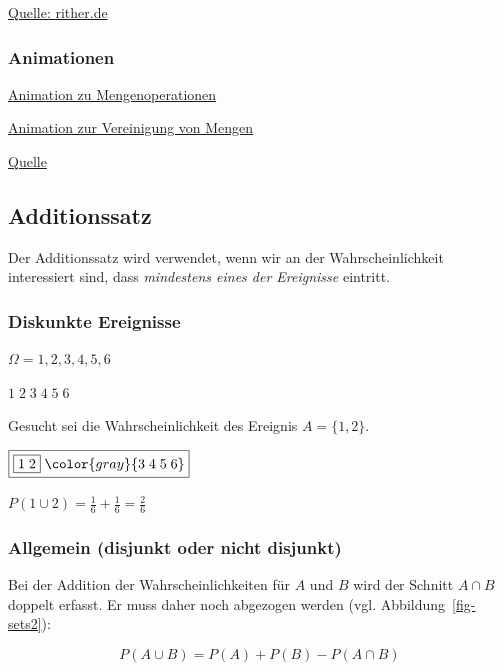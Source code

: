 \documentclass[
  a4paper,
  DIV=11]{scrreprt}
\theoremstyle{definition}
\theoremstyle{remark}
\begin{document}
\href{http://www.rither.de/a/mathematik/stochastik/mengentheorie-und-venn-diagramme/}{Quelle:
rither.de}

\hypertarget{animationen}{%
\subsubsection{Animationen}\label{animationen}}

\href{https://seeing-theory.brown.edu/compound-probability/index.html}{Animation
zu Mengenoperationen}

\href{https://www.geogebra.org/m/GEZV4xXc\#material/cmXR8fHN}{Animation
zur Vereinigung von Mengen}

\href{Geogebra,\%20J.\%20Merschhemke}{Quelle}

\hypertarget{additionssatz}{%
\subsection{Additionssatz}\label{additionssatz}}

Der Additionssatz wird verwendet, wenn wir an der Wahrscheinlichkeit
interessiert sind, dass \emph{mindestens eines der Ereignisse} eintritt.

\hypertarget{diskunkte-ereignisse}{%
\subsubsection{Diskunkte Ereignisse}\label{diskunkte-ereignisse}}

\(\Omega = {1,2,3,4,5,6}\)

\(\boxed{1\; 2\; 3\; 4\; 5\; 6}\)

Gesucht sei die Wahrscheinlichkeit des Ereignis \(A=\{1,2\}\).

\(\boxed{\boxed{1\; 2}\; \color{gray}{ 3\; 4\; 5\; 6}}\)

\(P(1 \cup 2) = \frac{1}{6} + \frac{1}{6} = \frac{2}{6}\)

\hypertarget{allgemein-disjunkt-oder-nicht-disjunkt}{%
\subsubsection{Allgemein (disjunkt oder nicht
disjunkt)}\label{allgemein-disjunkt-oder-nicht-disjunkt}}

Bei der Addition der Wahrscheinlichkeiten für \(A\) und \(B\) wird der
Schnitt \(A\cap B\) doppelt erfasst. Er muss daher noch abgezogen werden
(vgl. Abbildung~\ref{fig-sets2}):

\[P(A \cup B) = P(A) + P(B) - P(A\cap B)\]
\end{document}
